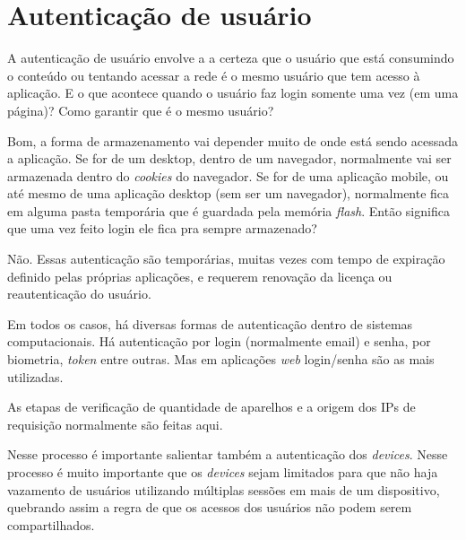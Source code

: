 \section{Autentica\c{c}\~ao de usu\'ario}
\label{subsection:autenticacao_usuario}
A autentica\c{c}\~ao de usu\'ario envolve a a certeza que o usu\'ario que est\'a consumindo o conte\'udo ou tentando acessar a rede \'e o mesmo usu\'ario que tem acesso \`a aplica\c{c}\~ao. E o que acontece quando o usu\'ario faz login somente uma vez (em uma p\'agina)? Como garantir que \'e o mesmo usu\'ario?

Bom, a forma de armazenamento vai depender muito de onde est\'a sendo acessada a aplica\c{c}\~ao. Se for de um desktop, dentro de um navegador, normalmente vai ser armazenada dentro do \textit{cookies} do navegador. Se for de uma aplica\c{c}\~ao mobile, ou at\'e mesmo de uma aplica\c{c}\~ao desktop (sem ser um navegador), normalmente fica em alguma pasta tempor\'aria que \'e guardada pela mem\'oria \textit{flash}. Ent\~ao significa que uma vez feito login ele fica pra sempre armazenado?

N\~ao. Essas autentica\c{c}\~ao s\~ao tempor\'arias, muitas vezes com tempo de expira\c{c}\~ao definido pelas pr\'oprias aplica\c{c}\~oes, e requerem renova\c{c}\~ao da licen\c{c}a ou reautentica\c{c}\~ao do usu\'ario. 

Em todos os casos, h\'a diversas formas de autentica\c{c}\~ao dentro de sistemas computacionais. H\'a autentica\c{c}\~ao por login (normalmente email) e senha, por biometria, \textit{token} entre outras. Mas em aplica\c{c}\~oes \textit{web} login/senha s\~ao as mais utilizadas.

As etapas de verifica\c{c}\~ao de quantidade de aparelhos e a origem dos IPs de requisi\c{c}\~ao normalmente s\~ao feitas aqui.

Nesse processo \'e importante salientar tamb\'em a autentica\c{c}\~ao dos \textit{devices}. Nesse processo \'e muito importante que os \textit{devices} sejam limitados para que n\~ao haja vazamento de usu\'arios utilizando m\'ultiplas sess\~oes em mais de um dispositivo, quebrando assim a regra de que os acessos dos usu\'arios n\~ao podem serem compartilhados.

